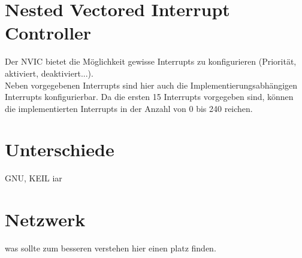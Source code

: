 \section{Nested Vectored Interrupt Controller}
Der NVIC bietet die M\"oglichkeit gewisse Interrupts zu konfigurieren
(Priorit\"at, aktiviert, deaktiviert...). \\
Neben vorgegebenen Interrupts sind hier auch die Implementierungsabh\"angigen
Interrupts konfigurierbar. Da die ersten 15 Interrupts vorgegeben sind, k\"onnen
die implementierten Interrupts in der Anzahl von 0 bis 240 reichen.

\section{Unterschiede}
GNU, KEIL iar

\section{Netzwerk}
was sollte zum besseren verstehen hier einen platz finden.
